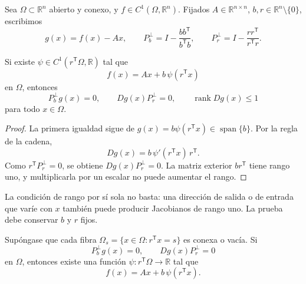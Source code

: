 Sea \(\Omega\subset\mathbb R^n\) abierto y conexo, y
\(f\in C^1(\Omega,\mathbb R^n)\). Fijados \(A\in\mathbb R^{n\times n}\),
\(b,r\in\mathbb R^n\setminus\{0\}\), escribimos
\begin{equation}
 g(x)=f(x)-Ax,\qquad
 P_b^\perp=I-\frac{bb^{\mathsf T}}{b^{\mathsf T}b},\qquad
 P_r^\perp=I-\frac{rr^{\mathsf T}}{r^{\mathsf T}r}.
 \label{eq:th-projectors}
\end{equation}

\begin{proposition}[necesidad]
\label{prop:rank-one-necessary}
Si existe \(\psi\in C^1(r^{\mathsf T}\Omega,\mathbb R)\) tal que
\[
 f(x)=Ax+b\,\psi(r^{\mathsf T}x)
\]
en \(\Omega\), entonces
\begin{equation}
 P_b^\perp g(x)=0,\qquad
 Dg(x)P_r^\perp=0,\qquad
 \operatorname{rank}Dg(x)\leq1
 \label{eq:th-rank-necessary}
\end{equation}
para todo \(x\in\Omega\).
\end{proposition}

\begin{proof}
La primera igualdad sigue de
\(g(x)=b\psi(r^{\mathsf T}x)\in\operatorname{span}\{b\}\). Por la regla de la
cadena,
\[
 Dg(x)=b\,\psi'(r^{\mathsf T}x)\,r^{\mathsf T}.
\]
Como \(r^{\mathsf T}P_r^\perp=0\), se obtiene
\(Dg(x)P_r^\perp=0\). La matriz exterior \(br^{\mathsf T}\) tiene rango uno,
y multiplicarla por un escalar no puede aumentar el rango.
\end{proof}

La condición de rango por sí sola no basta: una dirección de salida o de
entrada que varíe con \(x\) también puede producir Jacobianos de rango uno. La
prueba debe conservar \(b\) y \(r\) fijos.

\begin{proposition}
\label{prop:rank-one-sufficient}
Supóngase que cada fibra
\(\Omega_s=\{x\in\Omega:r^{\mathsf T}x=s\}\) es conexa o vacía. Si
\[
 P_b^\perp g(x)=0,\qquad Dg(x)P_r^\perp=0
\]
en \(\Omega\), entonces existe una función
\(\psi:r^{\mathsf T}\Omega\to\mathbb R\) tal que
\[
 f(x)=Ax+b\,\psi(r^{\mathsf T}x).
\]
\end{proposition}

